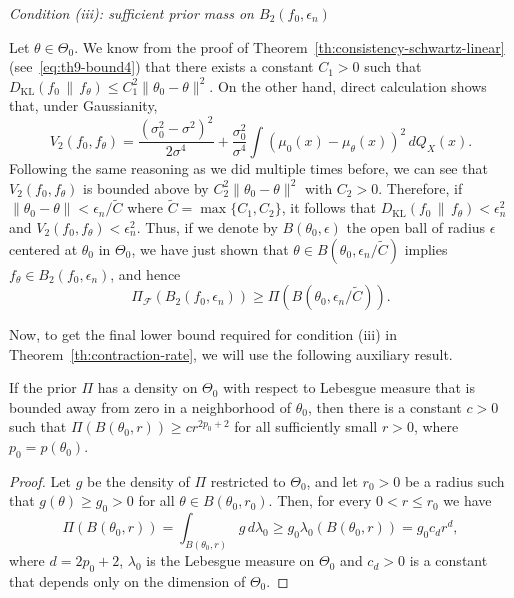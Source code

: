 \noindent\textit{Condition (iii): sufficient prior mass on \(B_2(f_0, \epsilon_n)\)}

\noindent Let \(\theta\in\Theta_0\). We know from the proof of Theorem~\ref{th:consistency-schwartz-linear} (see~\eqref{eq:th9-bound4}) that there exists a constant \(C_1>0\) such that \(D_{\mathrm{KL}}(f_0 \,\|\, f_\theta)\leq C_1^2 \|\theta_0 - \theta\|^2\). On the other hand, direct calculation \citep[see e.g.][]{choi2007posterior} shows that, under Gaussianity,
\[
  V_2(f_0, f_\theta) = \frac{(\sigma_0^2 - \sigma^2)^2}{2\sigma^4} + \frac{\sigma_0^2}{\sigma^4}\int (\mu_0(x) - \mu_\theta(x))^2\, dQ_X(x).
\]
Following the same reasoning as we did multiple times before, we can see that \(V_2(f_0, f_\theta)\) is bounded above by \(C_2^2\|\theta_0 - \theta\|^2\) with \(C_2>0\). Therefore, if \(\|\theta_0 - \theta\| < \epsilon_n/\tilde C\) where \(\tilde C = \max\{C_1, C_2\}\), it follows that \(D_{\mathrm{KL}}(f_0 \,\|\, f_\theta)< \epsilon_n^2\) and \(V_2(f_0, f_\theta) < \epsilon_n^2\). Thus, if we denote by \(B(\theta_0, \epsilon)\) the open ball of radius \(\epsilon\) centered at \(\theta_0\) in \(\Theta_0\), we have just shown that \(\theta \in B(\theta_0,\epsilon_n/\tilde{C})\) implies \(f_\theta \in B_2(f_0, \epsilon_n)\), and hence
\begin{equation}\label{eq:th11-bound2}
  \Pi_{\mathcal F}(B_2(f_0, \epsilon_n)) \geq \Pi(B(\theta_0,\epsilon_n/\tilde{C})).
\end{equation}

Now, to get the final lower bound required for condition (iii) in Theorem~\ref{th:contraction-rate}, we will use the following auxiliary result.

\begin{lemma}\label{lemma:th11-lemma-lebesgue}
  If the prior \(\Pi\) has a density on \(\Theta_0\) with respect to Lebesgue measure that is bounded away from zero in a neighborhood of \(\theta_0\), then there is a constant \(c>0\) such that \(\Pi(B(\theta_0, r))\geq cr^{2p_0+2}\) for all sufficiently small \(r>0\), where \(p_0=p(\theta_0)\).
\end{lemma}
\begin{proof}
  Let \(g\) be the density of \(\Pi\) restricted to \(\Theta_0\), and let \(r_0>0\) be a radius such that \(g(\theta)\geq g_0>0\) for all \(\theta\in B(\theta_0, r_0)\). Then, for every \(0<r\leq r_0\) we have
  \[
    \Pi(B(\theta_0, r)) =\int_{B(\theta_0, r)} g\, d\lambda_0 \geq g_0 \lambda_0(B(\theta_0, r)) = g_0 c_d r^d,
  \]
  where \(d=2p_0+2\), \(\lambda_0\) is the Lebesgue measure on \(\Theta_0\) and \(c_d>0\) is a constant that depends only on the dimension of \(\Theta_0\).
  \end{proof}
  
